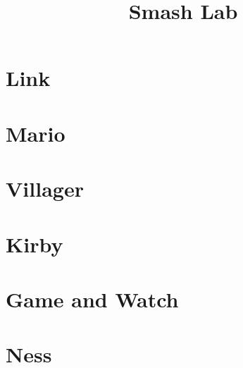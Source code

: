 \documentclass[]{smashlab}
\newcommand{\level}[1]{\section*{#1}}
\begin{document}
\title{Smash Lab}

\level{Link}
% 

\newpage

\level{Mario}
% 

\newpage

\level{Villager}
% 

\newpage

\level{Kirby}
% 

\newpage

\level{Game and Watch}
% 

\newpage

\level{Ness}
% 
\end{document}
